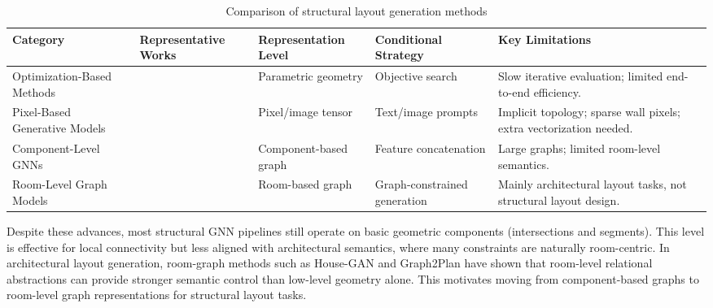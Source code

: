 \begin{table}[t]
\centering
\caption{Comparison of structural layout generation methods}
\label{tab:related_work}
\small
\setlength{\tabcolsep}{4pt}
\begin{tabularx}{\textwidth}{
>{\raggedright\arraybackslash}p{3.5cm}
>{\raggedright\arraybackslash}p{2.5cm}
>{\raggedright\arraybackslash}p{3.0cm}
>{\raggedright\arraybackslash\hsize=0.85\hsize}X
>{\raggedright\arraybackslash\hsize=1.15\hsize}X
}
\toprule
Category & Representative Works & Representation Level & Conditional Strategy & Key Limitations \\
\midrule
Optimization-Based Methods & \cite{zhouAutomatedStructuralDesign2022b,muellerCombiningStructuralPerformance2015,luoAlphaTrussMonteCarlo2022a} & Parametric geometry & Objective search & Slow iterative evaluation; limited end-to-end efficiency. \\
Pixel-Based Generative Models & \cite{liaoAutomatedStructuralDesign2021a,zhouStructDiffusionEndendIntelligent2024,luIntelligentStructuralDesign2022a,liFrameDiffusionLatentDiffusion2025} & Pixel/image tensor & Text/image prompts & Implicit topology; sparse wall pixels; extra vectorization needed. \\
Component-Level GNNs & \cite{zhaoIntelligentDesignShear2023b,zhaoDesignconditioninformedShearWall2023d,IntelligentCodesignShear2025} & Component-based graph & Feature concatenation & Large graphs; limited room-level semantics. \\
Room-Level Graph Models & \cite{nauataHouseGANRelationalGenerative2020,huGraph2PlanLearningFloorplan2020} & Room-based graph & Graph-constrained generation & Mainly architectural layout tasks, not structural layout design. \\
\bottomrule
\end{tabularx}
\end{table}

Despite these advances, most structural GNN pipelines still operate on basic geometric components (intersections and segments). This level is effective for local connectivity but less aligned with architectural semantics, where many constraints are naturally room-centric. In architectural layout generation, room-graph methods such as House-GAN \cite{nauataHouseGANRelationalGenerative2020,nauataHouseGANGenerativeAdversarial2021a} and Graph2Plan \cite{huGraph2PlanLearningFloorplan2020} have shown that room-level relational abstractions can provide stronger semantic control than low-level geometry alone. This motivates moving from component-based graphs to room-level graph representations for structural layout tasks.



